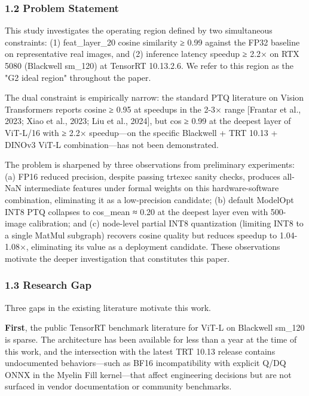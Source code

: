 \documentclass[
]{article}
\begin{document}
\subsubsection{1.2 Problem Statement}\label{12-problem-statement}

This study investigates the operating region defined by two simultaneous
constraints: (1) feat\_layer\_20 cosine similarity ≥ 0.99 against the
FP32 baseline on representative real images, and (2) inference latency
speedup ≥ 2.2× on RTX 5080 (Blackwell sm\_120) at TensorRT 10.13.2.6. We
refer to this region as the "G2 ideal region" throughout the paper.

The dual constraint is empirically narrow: the standard PTQ literature
on Vision Transformers reports cosine ≥ 0.95 at speedups in the 2-3×
range {[}Frantar et al., 2023; Xiao et al., 2023; Liu et al., 2024{]},
but cos ≥ 0.99 at the deepest layer of ViT-L/16 with ≥ 2.2× speedup---on
the specific Blackwell + TRT 10.13 + DINOv3 ViT-L combination---has not
been demonstrated.

The problem is sharpened by three observations from preliminary
experiments: (a) FP16 reduced precision, despite passing trtexec sanity
checks, produces all-NaN intermediate features under formal weights on
this hardware-software combination, eliminating it as a low-precision
candidate; (b) default ModelOpt INT8 PTQ collapses to cos\_mean ≈ 0.20
at the deepest layer even with 500-image calibration; and (c) node-level
partial INT8 quantization (limiting INT8 to a single MatMul subgraph)
recovers cosine quality but reduces speedup to 1.04-1.08×, eliminating
its value as a deployment candidate. These observations motivate the
deeper investigation that constitutes this paper.

\subsubsection{1.3 Research Gap}\label{13-research-gap}

Three gaps in the existing literature motivate this work.

\textbf{First}, the public TensorRT benchmark literature for ViT-L on
Blackwell sm\_120 is sparse. The architecture has been available for
less than a year at the time of this work, and the intersection with the
latest TRT 10.13 release contains undocumented behaviors---such as BF16
incompatibility with explicit Q/DQ ONNX in the Myelin Fill kernel---that
affect engineering decisions but are not surfaced in vendor
documentation or community benchmarks.
\end{document}
